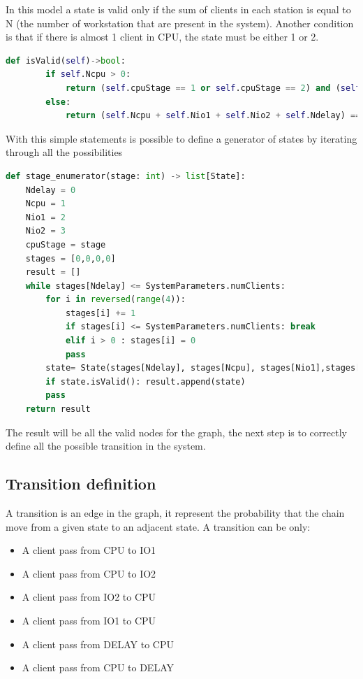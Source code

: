 \documentclass[12pt,a4paper]{article}
\begin{document}
In this model a state is valid only if the sum of clients in each station is equal to N (the number of workstation that are present in the system). Another condition is that if there is almost 1 client in CPU, the state must be either 1 or 2.

\begin{lstlisting}[language=python,breaklines]
    def isValid(self)->bool:
        if self.Ncpu > 0:
            return (self.cpuStage == 1 or self.cpuStage == 2) and (self.Ncpu + self.Nio1 + self.Nio2 + self.Ndelay) == SystemParameters.numClients
        else:
            return (self.Ncpu + self.Nio1 + self.Nio2 + self.Ndelay) == SystemParameters.numClients
\end{lstlisting}

With this simple statements is possible to define a generator of states by iterating through all the possibilities 

\begin{lstlisting}[language=python,breaklines]
def stage_enumerator(stage: int) -> list[State]:
    Ndelay = 0
    Ncpu = 1
    Nio1 = 2
    Nio2 = 3
    cpuStage = stage
    stages = [0,0,0,0]
    result = []
    while stages[Ndelay] <= SystemParameters.numClients:
        for i in reversed(range(4)):
            stages[i] += 1
            if stages[i] <= SystemParameters.numClients: break
            elif i > 0 : stages[i] = 0
            pass
        state= State(stages[Ndelay], stages[Ncpu], stages[Nio1],stages[Nio2],stage)
        if state.isValid(): result.append(state)
        pass
    return result
\end{lstlisting}

The result will be all the valid nodes for the graph, the next step is to correctly define all the possible transition in the system.

\subsection{Transition definition}
A transition is an edge in the graph, it represent the probability that the chain move from a given state to an adjacent state. A transition can be only:
\begin{itemize}
    \item A client pass from CPU to IO1 
    \item A client pass from CPU to IO2 
    \item A client pass from IO2 to CPU
    \item A client pass from IO1 to CPU
    \item A client pass from DELAY to CPU
    \item A client pass from CPU to DELAY
\end{itemize}
\end{document}
